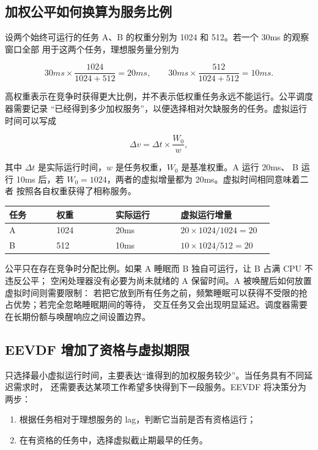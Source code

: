 \subsection{加权公平如何换算为服务比例}

设两个始终可运行的任务 A、B 的权重分别为 1024 和 512。若一个 30ms 的观察窗口全部
用于这两个任务，理想服务量分别为

\[
30ms\times\frac{1024}{1024+512}=20ms,\qquad
30ms\times\frac{512}{1024+512}=10ms.
\]

高权重表示在竞争时获得更大比例，并不表示低权重任务永远不能运行。公平调度器需要记录
“已经得到多少加权服务”，以便选择相对欠缺服务的任务。虚拟运行时间可以写成

\[
\Delta v=\Delta t\times\frac{W_0}{w},
\]

其中 $\Delta t$ 是实际运行时间，$w$ 是任务权重，$W_0$ 是基准权重。A 运行 20ms、
B 运行 10ms 后，若 $W_0=1024$，两者的虚拟增量都为 20ms。虚拟时间相同意味着二者
按照各自权重获得了相称服务。

\begin{longtable}{|L{0.16\linewidth}|L{0.2\linewidth}|L{0.22\linewidth}|L{0.28\linewidth}|}
\toprule
任务 & 权重 & 实际运行 & 虚拟运行增量 \\
\midrule
A & 1024 & 20ms & $20\times1024/1024=20$ \\\tablerowrule
B & 512 & 10ms & $10\times1024/512=20$ \\
\bottomrule
\end{longtable}

公平只在存在竞争时分配比例。如果 A 睡眠而 B 独自可运行，让 B 占满 CPU 不违反公平；
空闲处理器没有必要为尚未就绪的 A 保留时间。A 被唤醒后如何放置虚拟时间则需要限制：
若把它放到所有任务之前，频繁睡眠可以获得不受限的抢占优势；若完全忽略睡眠期间的等待，
交互任务又会出现明显延迟。调度器需要在长期份额与唤醒响应之间设置边界。

\subsection{EEVDF 增加了资格与虚拟期限}

只选择最小虚拟运行时间，主要表达“谁得到的加权服务较少”。当任务具有不同延迟需求时，
还需要表达某项工作希望多快得到下一段服务。EEVDF 将决策分为两步：

\begin{enumerate}
\tightlist
\item 根据任务相对于理想服务的 lag，判断它当前是否有资格运行；
\item 在有资格的任务中，选择虚拟截止期最早的任务。
\end{enumerate}

